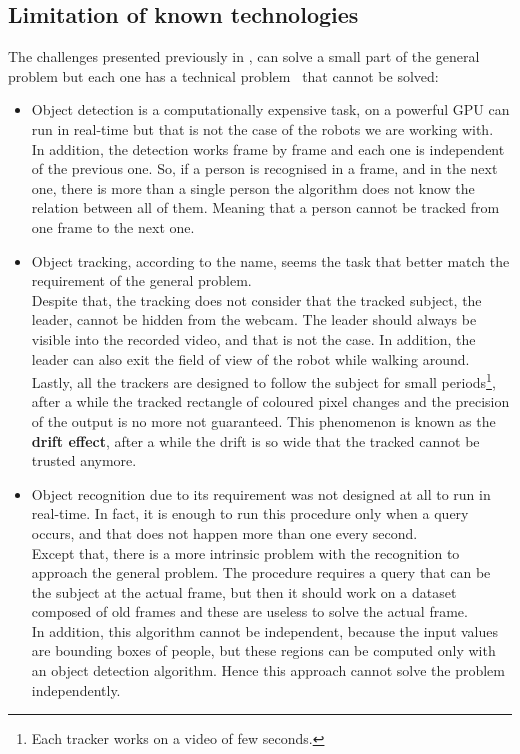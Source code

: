 \subsection{Limitation of known technologies}
The challenges presented previously in , can solve a small part of the general problem but each one has a technical problem~ that cannot be solved:
\begin{itemize}
	\item Object detection is a computationally expensive task, on a powerful GPU can run in real-time but that is not the case of the robots we are working with.\\
	In addition, the detection works frame by frame and each one is independent of the previous one. So, if a person is recognised in a frame, and in the next one, there is more than a single person the algorithm does not know the relation between all of them. Meaning that a person cannot be tracked from one frame to the next one.

	\item Object tracking, according to the name, seems the task that better match the requirement of the general problem.\\
	Despite that, the tracking does not consider that the tracked subject, the leader, cannot be hidden from the webcam. The leader should always be visible into the recorded video, and that is not the case. In addition, the leader can also exit the field of view of the robot while walking around.\\
	Lastly, all the trackers are designed to follow the subject for small periods\footnote{Each tracker works on a video of few seconds.}, after a while the tracked rectangle of coloured pixel changes and the precision of the output is no more not guaranteed. This phenomenon is known as the \textbf{drift effect}, after a while the drift is so wide that the tracked cannot be trusted anymore.

	\item Object recognition due to its requirement was not designed at all to run in real-time. In fact, it is enough to run this procedure only when a query occurs, and that does not happen more than one every second.\\
	Except that, there is a more intrinsic problem with the recognition to approach the general problem. The procedure requires a query that can be the subject at the actual frame, but then it should work on a dataset composed of old frames and these are useless to solve the actual frame.\\
	In addition, this algorithm cannot be independent, because the input values are bounding boxes of people, but these regions can be computed only with an object detection algorithm. Hence this approach cannot solve the problem independently.
\end{itemize}

